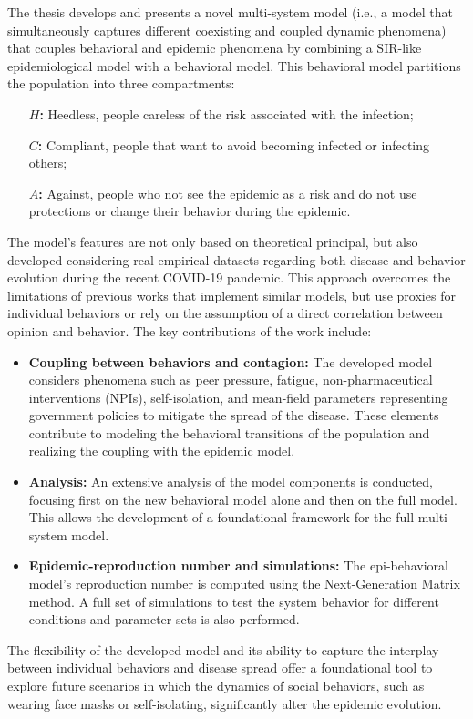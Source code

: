 The thesis develops and presents a novel multi-system model (i.e., a model that simultaneously captures different coexisting and coupled dynamic phenomena) that couples behavioral and epidemic phenomena by combining a SIR-like epidemiological model with a behavioral model. This behavioral model partitions the population into three compartments: 
\begin{itemize}
	\item[\textbf{$H$:}] Heedless, people careless of the risk associated with the infection;
	\item[\textbf{$C$:}] Compliant, people that want to avoid becoming infected or infecting others;
	\item[\textbf{$A$:}]Against, people who not see the epidemic as a risk and do not use protections or change their behavior during the epidemic.
\end{itemize}
 The model's features are not only based on theoretical principal, but also developed considering real empirical datasets regarding both disease and behavior evolution during the recent COVID-19 pandemic. This approach overcomes the limitations of previous works that implement similar models, but use proxies for individual behaviors or rely on the assumption of a direct correlation between opinion and behavior.
The key contributions of the work include:
\begin{itemize}
	\item \textbf{Coupling between behaviors and contagion:} The developed model considers phenomena such as peer pressure, fatigue, non-pharmaceutical interventions (NPIs), self-isolation, and mean-field parameters representing government policies to mitigate the spread of the disease. These elements contribute to modeling the behavioral transitions of the population and realizing the coupling with the epidemic model.
	\item \textbf{Analysis:} An extensive analysis of the model components is conducted, focusing first on the new behavioral model alone and then on the full model. This allows the development of a foundational framework for the full multi-system model.
	\item \textbf{Epidemic-reproduction number and simulations:} The epi-behavioral model's reproduction number is computed using the Next-Generation Matrix method. A full set of simulations to test the system behavior for different conditions and parameter sets is also performed.
\end{itemize}
The flexibility of the developed model and its ability to capture the interplay between individual behaviors and disease spread offer a foundational tool to explore future scenarios in which the dynamics of social behaviors, such as wearing face masks or self-isolating, significantly alter the epidemic evolution.